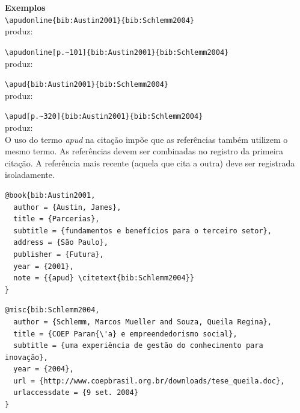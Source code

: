 \documentclass[a4paper,12pt,oneside,onecolumn,final,fleqn]{repUERJ}
\begin{document}
\noindent\textbf{Exemplos}\\

\noindent\texttt{\textbackslash apudonline\{bib:Austin2001\}\{bib:Schlemm2004\}}\\
 \hspace*{\parindent}produz: 

\noindent\texttt{\textbackslash apudonline[p.\~{}101]\{bib:Austin2001\}\{bib:Schlemm2004\}}\\
\hspace*{\parindent}produz: 

\noindent\texttt{\textbackslash apud\{bib:Austin2001\}\{bib:Schlemm2004\}}\\
\hspace*{\parindent}produz: 

\noindent\texttt{\textbackslash apud[p.\~{}320]\{bib:Austin2001\}\{bib:Schlemm2004\}}\\
\hspace*{\parindent}produz: \\

O uso do termo \textsl{apud} na citação impõe que as referências também utilizem o mesmo termo. As referências devem ser combinadas no registro da primeira citação. A referência mais recente (aquela que cita a outra) deve ser registrada isoladamente.\\

\noindent{}

\begin{verbatim}
@book{bib:Austin2001,
  author = {Austin, James},
  title = {Parcerias},
  subtitle = {fundamentos e benefícios para o terceiro setor},
  address = {São Paulo},
  publisher = {Futura},
  year = {2001},
  note = {{apud} \citetext{bib:Schlemm2004}}
}
\end{verbatim}

\noindent{}

\begin{verbatim}
@misc{bib:Schlemm2004,
  author = {Schlemm, Marcos Mueller and Souza, Queila Regina},
  title = {COEP Paran{\'a} e empreendedorismo social},
  subtitle = {uma experiência de gestão do conhecimento para inovação},
  year = {2004},
  url = {http://www.coepbrasil.org.br/downloads/tese_queila.doc},
  urlaccessdate = {9 set. 2004}
}
\end{verbatim}
\end{document}
